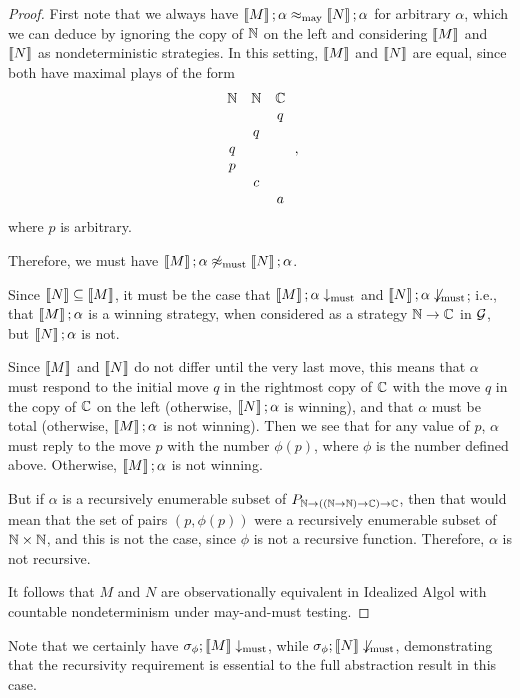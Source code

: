 \documentclass[11pt]{report}
\begin{document}
\begin{proof}
  First note that we always have $\left\llbracket M\right\rrbracket;\alpha\approx_{\operatorname{may}}\left\llbracket N\right\rrbracket;\alpha$ for arbitrary $\alpha$, which we can deduce by ignoring the copy of $\mathbb{N}$ on the left and considering $\left\llbracket M\right\rrbracket$ and $\left\llbracket N\right\rrbracket$ as nondeterministic strategies.  
  In this setting, $\left\llbracket M\right\rrbracket$ and $\left\llbracket N\right\rrbracket$ are equal, since both have maximal plays of the form
  \[
    \begin{array}{ccc}
      \mathbb{N} & \mathbb{N} & \mathbb{C} \\
          &     &  q  \\
          &  q  &     \\
       q  &     &     \\
       p  &     &     \\
          &  c  &     \\
          &     & a
    \end{array}\,,
    \]
  where $p$ is arbitrary.  

  Therefore, we must have $\left\llbracket M\right\rrbracket;\alpha \not\approx_{\operatorname{must}}\left\llbracket N\right\rrbracket;\alpha$.

  Since $\left\llbracket N\right\rrbracket \subseteq \left\llbracket M\right\rrbracket$, it must be the case that $\left\llbracket M\right\rrbracket;\alpha\downarrow_{\operatorname{must}}$ and $\left\llbracket N\right\rrbracket;\alpha\not\downarrow_{\operatorname{must}}$; i.e., that $\left\llbracket M\right\rrbracket;\alpha$ is a winning strategy, when considered as a strategy $\mathbb{N} \to \mathbb{C}$ in $\mathcal G$, but $\left\llbracket N\right\rrbracket;\alpha$ is not.

  Since $\left\llbracket M\right\rrbracket$ and $\left\llbracket N\right\rrbracket$ do not differ until the very last move, this means that $\alpha$ must respond to the initial move $q$ in the rightmost copy of $\mathbb{C}$ with the move $q$ in the copy of $\mathbb{C}$ on the left (otherwise, $\left\llbracket N\right\rrbracket;\alpha$ is winning), and that $\alpha$ must be total (otherwise, $\left\llbracket M\right\rrbracket;\alpha$ is not winning).
  Then we see that for any value of $p$, $\alpha$ must reply to the move $p$ with the number $\phi(p)$, where $\phi$ is the number defined above.  
  Otherwise, $\left\llbracket M\right\rrbracket;\alpha$ is not winning.

  But if $\alpha$ is a recursively enumerable subset of $P_{\mathbb{N} \to ((\mathbb{N} \to \mathbb{N}) \to \mathbb{C}) \to \mathbb{C}}$, then that would mean that the set of pairs $(p,\phi(p))$ were a recursively enumerable subset of $\mathbb{N} \times \mathbb{N}$, and this is not the case, since $\phi$ is not a recursive function.  
  Therefore, $\alpha$ is not recursive.  

  It follows that $M$ and $N$ are observationally equivalent in Idealized Algol with countable nondeterminism under may-and-must testing.
\end{proof}

Note that we certainly have $\sigma_\phi;\left\llbracket M\right\rrbracket\downarrow_{\operatorname{must}}$, while $\sigma_\phi;\left\llbracket N\right\rrbracket\not\downarrow_{\operatorname{must}}$, demonstrating that the recursivity requirement is essential to the full abstraction result in this case.
\end{document}
